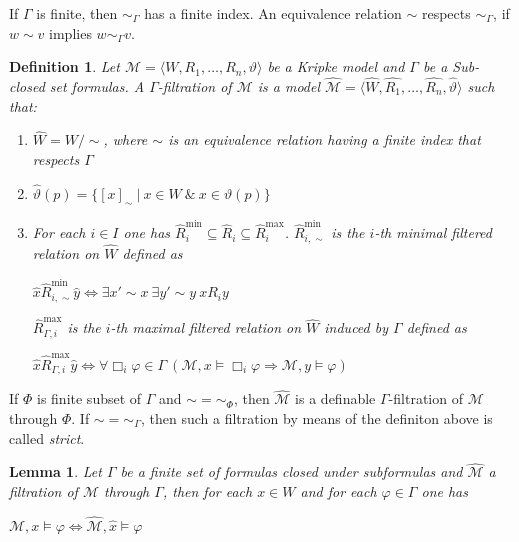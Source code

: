 \documentclass[a4paper]{article}
\theoremstyle{defin}
\newtheorem{defin}{Definition}
\theoremstyle{theorem}
\theoremstyle{prop}
\theoremstyle{lemma}
\newtheorem{lemma}{Lemma}
\theoremstyle{ex}
\theoremstyle{col}
\begin{document}
If $\Gamma$ is finite, then $\sim_{\Gamma}$ has a finite index. An equivalence relation $\sim$ respects $\sim_{\Gamma}$, if $w \sim v$ implies $w \sim_{\Gamma} v$.

\begin{defin}
  Let $\mathcal{M} = \langle W, R_1, \dots, R_n, \vartheta \rangle$ be a Kripke model and $\Gamma$ be a Sub-closed set formulas. A $\Gamma$-filtration of $\mathcal{M}$ is a model
  $\widehat{\mathcal{M}} = \langle \widehat{W}, \widehat{R_1}, \dots, \widehat{R_n}, \widehat{\vartheta} \rangle$ such that:
  \begin{enumerate}
    \item $\widehat{W} = W / \sim$, where $\sim$ is an equivalence relation having a finite index that respects $\Gamma$
    \item $\widehat{\vartheta}(p) = \{ [x]_{\sim} \: | \: x \in W \: \& \: x \in \vartheta(p)\}$
    \item For each $i \in I$ one has $\widehat{R}_i^{\text{min}} \subseteq \widehat{R}_i \subseteq \widehat{R}_i^{\text{max}}$. $\widehat{R}_{i, \sim}^{\text{min}}$ is the $i$-th minimal filtered relation on $\widehat{W}$ defined as
    \begin{center}
      $\hat{x} \widehat{R}_{i, \sim}^{\text{min}} \hat{y} \Leftrightarrow \exists x' \sim x \: \exists y' \sim y \: x R_i y$
    \end{center}
    $\widehat{R}_{\Gamma,i}^{\text{max}}$ is the $i$-th maximal filtered relation on $\widehat{W}$ induced by $\Gamma$ defined as
    \begin{center}
      $\hat{x} \widehat{R}_{\Gamma,i}^{\text{max}} \hat{y} \Leftrightarrow \forall \Box_i \varphi \in \Gamma \: (\mathcal{M}, x \models \Box_i \varphi \Rightarrow \mathcal{M}, y \models \varphi)$
    \end{center}
  \end{enumerate}
\end{defin}

If $\Phi$ is finite subset of $\Gamma$ and $\sim = \sim_{\Phi}$, then $\widehat{\mathcal{M}}$ is a definable $\Gamma$-filtration of $\mathcal{M}$ through $\Phi$. If $\sim = \sim_{\Gamma}$, then such a filtration by means of the definiton above is called \emph{strict}.

\begin{lemma}
  Let $\Gamma$ be a finite set of formulas closed under subformulas and $\widehat{\mathcal{M}}$ a filtration of $\mathcal{M}$ through $\Gamma$, then for each $x \in W$ and for each $\varphi \in \Gamma$ one has
  \begin{center}
    $\mathcal{M}, x \models \varphi \Leftrightarrow \widehat{\mathcal{M}}, \hat{x} \models \varphi$
  \end{center}
\end{lemma}
\end{document}
